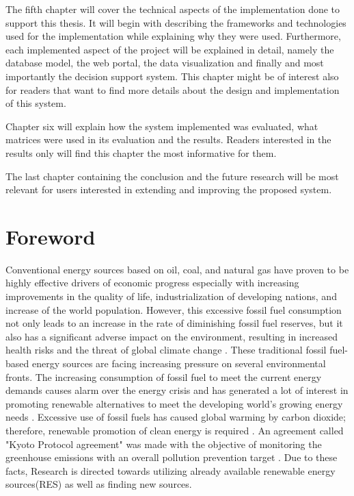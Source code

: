 \indent The fifth chapter will cover the technical aspects of the implementation done to support this thesis. It will begin with describing the frameworks and technologies used for the implementation while explaining why they were used. Furthermore, each implemented aspect of the project will be explained in detail, namely the database model, the web portal, the data visualization and finally and most importantly the decision support system. This chapter might be of interest also for readers that want to find more details about the design and implementation of this system.

\indent Chapter six will explain how the system implemented was evaluated, what matrices were used in its evaluation and the results. Readers interested in the results only will find this chapter the most informative for them.

\indent The last chapter containing the conclusion and the future research will be most relevant for users interested in extending and improving the proposed system.
\section{Foreword}
\label{sec:Foreword}
Conventional energy sources based on oil, coal, and natural gas have proven to be highly effective drivers of economic progress especially with increasing improvements in the quality of life, industrialization of developing nations, and increase of the world population. However, this excessive fossil fuel consumption not only leads to an increase in the rate of diminishing fossil fuel reserves, but it also has a significant adverse impact on the environment, resulting in increased health risks and the threat of global climate change \cite{herzog2001renewable}. These traditional fossil fuel-based energy sources are facing increasing pressure on several environmental fronts. The increasing consumption of fossil fuel to meet the current energy demands causes alarm over the energy crisis and has generated a lot of interest in promoting renewable alternatives to meet the developing world's growing energy needs \cite{youm2000renewable,hiemstra2009fuelwood}. Excessive use of fossil fuels has caused global warming by carbon dioxide; therefore, renewable promotion of clean energy is required \cite{hall1991cooling}. An agreement called "Kyoto Protocol agreement" was made  with the objective of monitoring the greenhouse emissions with an overall pollution prevention target \cite{panwar2011role}. Due to these facts, Research is directed towards utilizing already available renewable energy sources(RES) as well as finding new sources. 

